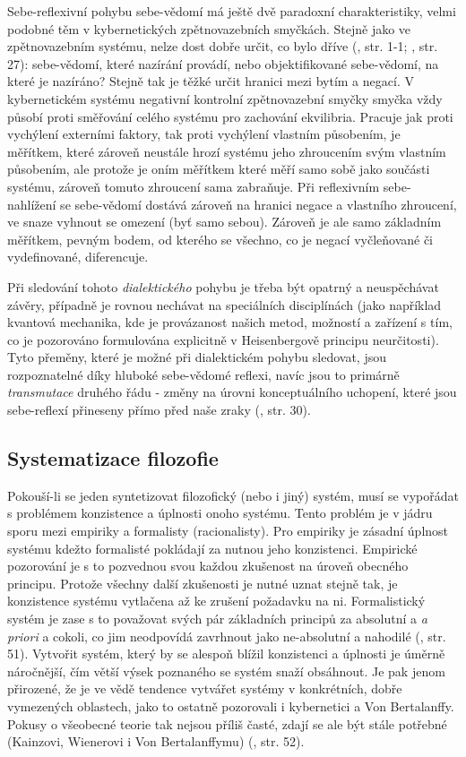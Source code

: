 \documentclass[11pt,a4paper]{article}
\begin{document}
Sebe-reflexivní pohybu sebe-vědomí má ještě dvě paradoxní charakteristiky, velmi podobné těm v kybernetických zpětnovazebních smyčkách. Stejně jako ve zpětnovazebním systému, nelze dost dobře určit, co bylo dříve (\cite{astrom_feedback_2021}, str. 1-1; \cite{kainz_paradox_1988}, str. 27): sebe-vědomí, které nazírání provádí, nebo objektifikované sebe-vědomí, na které je nazíráno? Stejně tak je těžké určit hranici mezi bytím a negací. V kybernetickém systému negativní kontrolní zpětnovazební smyčky smyčka vždy působí proti směřování celého systému pro zachování ekvilibria. Pracuje jak proti vychýlení externími faktory, tak proti vychýlení vlastním působením, je měřítkem, které zároveň neustále hrozí systému jeho zhroucením svým vlastním působením, ale protože je oním měřítkem které měří samo sobě jako součásti systému, zároveň tomuto zhroucení sama zabraňuje. Při reflexivním sebe-nahlížení se sebe-vědomí dostává zároveň na hranici negace a vlastního zhroucení, ve snaze vyhnout se omezení (byť samo sebou). Zároveň je ale samo základním měřítkem, pevným bodem, od kterého se všechno, co je negací vyčleňované či vydefinované, diferencuje. 

Při sledování tohoto \textit{dialektického} pohybu je třeba být opatrný a neuspěchávat závěry, případně je rovnou nechávat na speciálních disciplínách (jako například kvantová mechanika, kde je provázanost našich metod, možností a zařízení s tím, co je pozorováno formulována explicitně v Heisenbergově principu neurčitosti). Tyto přeměny, které je možné při dialektickém pohybu sledovat, jsou rozpoznatelné díky hluboké sebe-vědomé reflexi, navíc jsou to primárně \textit{transmutace} druhého řádu - změny na úrovni konceptuálního uchopení, které jsou sebe-reflexí přineseny přímo před naše zraky (\cite{kainz_paradox_1988}, str. 30).


\subsection{Systematizace filozofie}

Pokouší-li se jeden syntetizovat filozofický (nebo i jiný) systém, musí se vypořádat s problémem konzistence a úplnosti onoho systému. Tento problém je v jádru sporu mezi empiriky a formalisty (racionalisty). Pro empiriky je zásadní úplnost systému kdežto formalisté pokládají za nutnou jeho konzistenci. Empirické pozorování je s to pozvednou svou každou zkušenost na úroveň obecného principu. Protože všechny další zkušenosti je nutné uznat stejně tak, je konzistence systému vytlačena až ke zrušení požadavku na ni. Formalistický systém je zase s to považovat svých pár základních principů za absolutní a \textit{a priori} a cokoli, co jim neodpovídá zavrhnout jako ne-absolutní a nahodilé (\cite{hegel_natural_1975, kainz_paradox_1988}, str. 51).  Vytvořit systém, který by se alespoň blížil konzistenci a úplnosti je úměrně náročnější, čím větší výsek poznaného se systém  snaží obsáhnout. Je pak jenom přirozené, že je ve vědě tendence vytvářet systémy v konkrétních, dobře vymezených oblastech, jako to ostatně pozorovali i kybernetici a Von Bertalanffy. Pokusy o všeobecné teorie tak nejsou příliš časté, zdají se ale být stále potřebné (Kainzovi, Wienerovi i Von Bertalanffymu) (\cite{kainz_paradox_1988}, str. 52).
\end{document}
